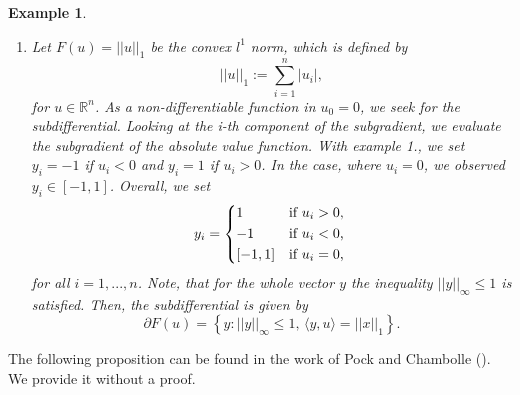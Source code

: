 \documentclass{scrreprt}
\newtheorem{proposition}[theorem]{Proposition}
\newtheorem{example}[theorem]{Example}
\begin{document}
\begin{example}
\begin{enumerate}
$$\begin{dcases*}
                                -1 & \textnormal{if $u < 0$,} \\
                                [-1, 1] & \textnormal{if $u = 0$.}
                            \end{dcases*}
                    $$
                \item Let $F(u) = ||u||_{1}$ be the convex $l^{1}$ norm, which is defined by
                    $$
                        ||u||_{1} := \sum_{i = 1}^{n} |u_{i}|,
                    $$
                for $u \in \mathbb{R}^{n}$. As a non-differentiable function in $u_{0} = 0$, we seek for the subdifferential. Looking at the i-th component of the subgradient, we evaluate the subgradient of the absolute value function. With example 1., we set $y_{i} = -1$ if $u_{i} < 0$ and $y_{i} = 1$ if $u_{i} > 0$. In the case, where $u_{i} = 0$, we observed $y_{i} \in [-1,1]$. Overall, we set
                    $$
                        y_{i} =
                            \begin{dcases*}
                                1 & \textnormal{if $u_{i} > 0$,} \\
                                -1 & \textnormal{if $u_{i} < 0$,} \\
                                [-1,1] & \textnormal{if $u_{i} = 0$,}
                            \end{dcases*}
                    $$
                for all $i = 1, ..., n$. Note, that for the whole vector $y$ the inequality $||y||_{\infty} \le 1$ is satisfied. Then, the subdifferential is given by
                    $$
                        \partial F(u) = \left\{ y : ||y||_{\infty} \le 1, \, \langle y, u \rangle = ||x||_{1} \right\}.
                    $$
            \end{enumerate}
        \end{example}

        The following proposition can be found in the work of Pock and Chambolle (\cite{Chambolle-et-al-10}). We provide it without a proof.


\end{document}
